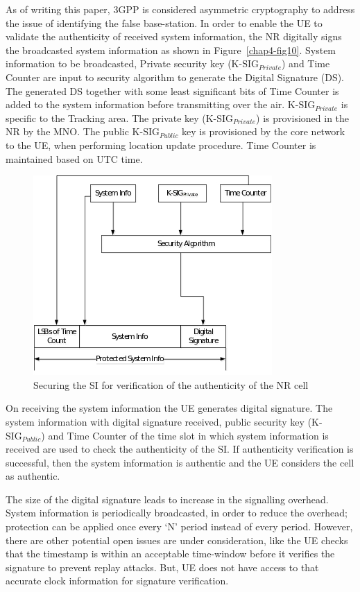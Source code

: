 \begin{multicols}{2}
As of writing this paper, 3GPP \cite{art4-key02} is considered asymmetric cryptography to address the issue of identifying the false base-station. In order to enable the UE to validate the authenticity of received system information, the NR digitally signs the broadcasted system information as shown in Figure~\ref{chap4-fig10}. System information to be broadcasted, Private security key (K-${\text{SIG}}_{Private}$) and Time Counter are input to security algorithm to generate the Digital Signature (DS). The generated DS together with some least significant bits of Time Counter is added to the system information before transmitting over the air. K-$\text{SIG}_{Private}$ is specific to the Tracking area. The private key (K-$\text{SIG}_{Private}$) is provisioned in the NR by the MNO. The public K-$\text{SIG}_{Public}$ key is provisioned by the core network to the UE, when performing location update procedure. Time Counter is maintained based on UTC time.  
\begin{figure}[H]
\centering
\includegraphics[scale=2.65]{src/Figures/chap4/chap4-fig11.jpg}
\caption{Securing the SI for verification of the authenticity of the NR cell}\label{chap4-fig11}
\end{figure}

On receiving the system information the UE generates digital signature.  The system information with digital signature received, public security key (K-$\text{SIG}_{Public}$) and Time Counter of the time slot in which system information is received are used to check the authenticity of the SI. If authenticity verification is successful, then the system information is authentic and the UE considers the cell as authentic.

The size of the digital signature leads to increase in the signalling overhead. System information is periodically broadcasted, in order to reduce the overhead; protection can be applied once every ‘N’ period instead of every period. However, there are other potential open issues are under consideration, like the UE checks that the timestamp is within an acceptable time-window before it verifies the signature to prevent replay attacks. But, UE does not have access to that accurate clock information for signature verification.


\end{multicols}
